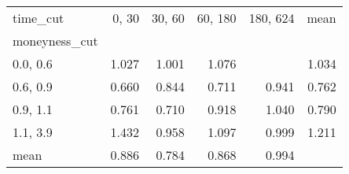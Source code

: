 \begin{tabular}{lrrrrr}
\toprule
time\_cut &  0, 30 &  30, 60 &  60, 180 &  180, 624 &  mean \\
moneyness\_cut &          &           &            &             &       \\
\midrule
0.0, 0.6    &    1.027 &     1.001 &      1.076 &             & 1.034 \\
0.6, 0.9    &    0.660 &     0.844 &      0.711 &       0.941 & 0.762 \\
0.9, 1.1    &    0.761 &     0.710 &      0.918 &       1.040 & 0.790 \\
1.1, 3.9    &    1.432 &     0.958 &      1.097 &       0.999 & 1.211 \\
mean          &    0.886 &     0.784 &      0.868 &       0.994 &       \\
\bottomrule
\end{tabular}
